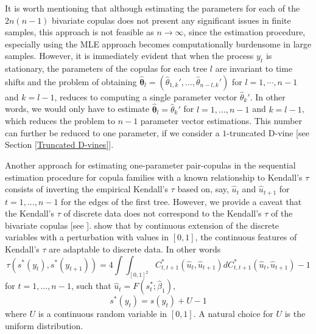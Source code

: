 \documentclass[harvard,11pt]{article}
\begin{document}
 It is worth mentioning that although estimating the parameters for each of the $2n(n-1)$ bivariate copulas does not present any significant issues in finite samples, this approach is not feasible as $n\rightarrow \infty$, since the estimation procedure, especially using the MLE approach becomes computationally burdensome in large samples. However, it is immediately evident that when the process $y_t$ is stationary, the parameters of the copulas for each tree $l$ are invariant to time shifts and the problem of obtaining $\pmb{\hat{\theta}}_l=(\hat{\theta}_{1,k}',...,\hat{\theta}_{n-l,k}')$ for $l=1,\cdots,n-1$ and $k=l-1$, reduces to computing a single parameter vector $\hat{\theta}_k'$. In other words, we would only have to estimate $\pmb{\hat{\theta}}_l=\hat{\theta}_k'$ for $l=1,...,n-1$ and $k=l-1$, which reduces the problem to $n-1$ parameter vector estimations. This number can further be reduced to one parameter, if we consider a $1$-truncated D-vine [see Section \ref{Truncated D-vines}].  


Another approach for estimating one-parameter pair-copulas in the sequential estimation procedure for copula families with a known relationship to Kendall's $\tau$ consists of inverting the empirical Kendall's $\tau$ based on, say, $\hat{u}_{t}$ and $\hat{u}_{t+1}$ for $t=1,...,n-1$ for the edges of the first tree. However, we provide a caveat that the Kendall's $\tau$ of discrete data does not correspond to the Kendall's $\tau$ of the bivariate copulas [see \citet{denuit2005constraints}]. \citet{denuit2005constraints} show that by continuous extension of the discrete variables with a perturbation with values in $[0,1]$, the continuous features of Kendall's $\tau$ are adaptable to discrete data. In other words
\[ 
\tau(s^*(y_{t}),s^*(y_{t+1}))=4\int\int_{[0,1]^2}C_{t,t+1}^*\left(\hat{u}_{t},\hat{u}_{t+1}\right)dC_{t,t+1}^*\left(\hat{u}_{t},\hat{u}_{t+1}\right)-1
\]
for $t=1,...,n-1$, such that $\hat{u}_{t}=F\left(s^*_t;\hat{\beta}_1\right)$,
\[
s^*(y_t)=s(y_t)+U-1
\]
where $U$ is a continuous random variable in $[0,1]$. A natural choice for $U$ is the uniform distribution.
\end{document}
